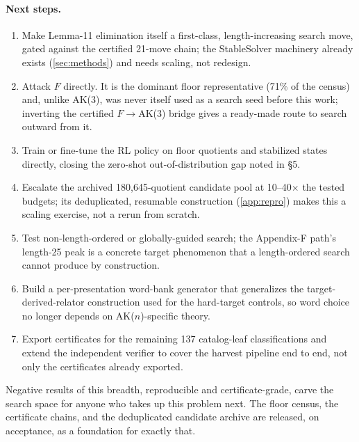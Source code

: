 \paragraph{Next steps.}
\begin{enumerate}
  \item Make Lemma-11 elimination itself a first-class, length-increasing search move,
    gated against the certified 21-move chain; the StableSolver machinery already exists
    (\ref{sec:methods}) and needs scaling, not redesign.
  \item Attack $F$ directly. It is the dominant floor representative (71\% of the census)
    and, unlike AK(3), was never itself used as a search seed before this work; inverting
    the certified $F\to$AK(3) bridge gives a ready-made route to search outward from it.
  \item Train or fine-tune the RL policy on floor quotients and stabilized states directly,
    closing the zero-shot out-of-distribution gap noted in \S5.
  \item Escalate the archived 180,645-quotient candidate pool at 10--40$\times$ the tested
    budgets; its deduplicated, resumable construction (\ref{app:repro}) makes this a scaling
    exercise, not a rerun from scratch.
  \item Test non-length-ordered or globally-guided search; the Appendix-F path's length-25
    peak is a concrete target phenomenon that a length-ordered search cannot produce by
    construction.
  \item Build a per-presentation word-bank generator that generalizes the
    target-derived-relator construction used for the hard-target controls, so word choice no
    longer depends on AK($n$)-specific theory.
  \item Export certificates for the remaining 137 catalog-leaf classifications and extend
    the independent verifier to cover the harvest pipeline end to end, not only the
    certificates already exported.
\end{enumerate}

Negative results of this breadth, reproducible and certificate-grade, carve the search
space for anyone who takes up this problem next. The floor census, the certificate chains,
and the deduplicated candidate archive are released, on acceptance, as a foundation for
exactly that.
